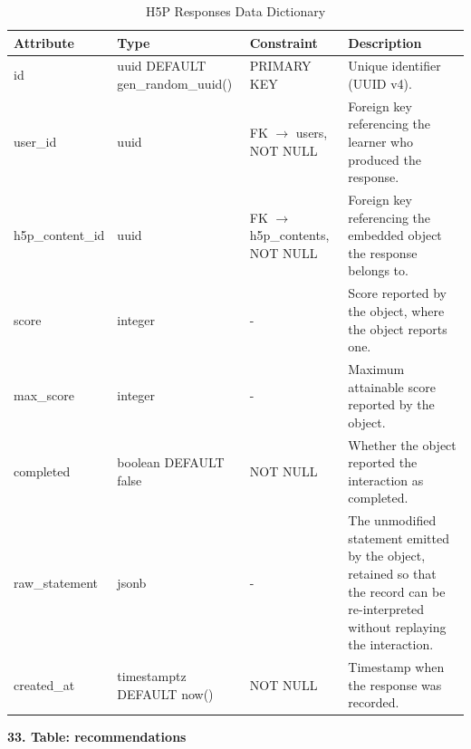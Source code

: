 \documentclass[12pt, oneside]{article} %
\newcommand{\tabbreak}{\hyphenpenalty=200\exhyphenpenalty=200\tolerance=4000\hbadness=10000\hspace{0pt}}
\begin{document}
\begin{table}[H]
\caption{H5P Responses Data Dictionary}
\label{tab:dd_h5p_responses}
\vspace{-4mm}
\begin{center}
\renewcommand{\arraystretch}{1.15}
\scriptsize
\begin{tabular}{|>{\raggedright\arraybackslash\tabbreak}p{2.67cm}|>{\raggedright\arraybackslash\tabbreak}p{2.93cm}|>{\raggedright\arraybackslash\tabbreak}p{2.67cm}|>{\raggedright\arraybackslash\tabbreak}p{4.51cm}|}
\hline
\textbf{Attribute} & \textbf{Type} & \textbf{Constraint} & \textbf{Description} \\ \hline
id & uuid DEFAULT gen\_random\_uuid() & PRIMARY KEY & Unique identifier (UUID v4). \\ \hline
user\_id & uuid & FK $\rightarrow$ users, NOT NULL & Foreign key referencing the learner who produced the response. \\ \hline
h5p\_content\_id & uuid & FK $\rightarrow$ h5p\_contents, NOT NULL & Foreign key referencing the embedded object the response belongs to. \\ \hline
score & integer & - & Score reported by the object, where the object reports one. \\ \hline
max\_score & integer & - & Maximum attainable score reported by the object. \\ \hline
completed & boolean DEFAULT false & NOT NULL & Whether the object reported the interaction as completed. \\ \hline
raw\_statement & jsonb & - & The unmodified statement emitted by the object, retained so that the record can be re-interpreted without replaying the interaction. \\ \hline
created\_at & timestamptz DEFAULT now() & NOT NULL & Timestamp when the response was recorded. \\ \hline
\end{tabular}
\end{center}
\end{table}

\textbf{33. Table: recommendations}
\end{document}
